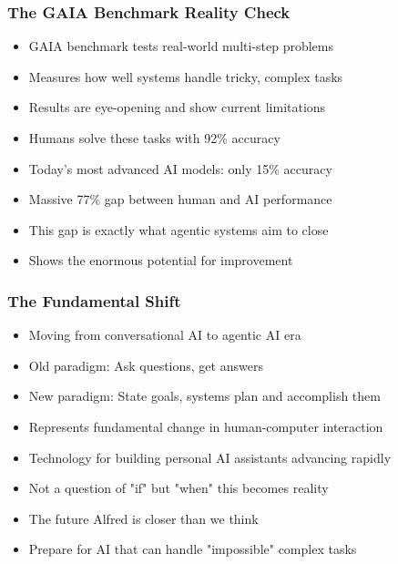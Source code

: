 \begin{frame}[fragile]\frametitle{The GAIA Benchmark Reality Check}
      \begin{itemize}
        \item GAIA benchmark tests real-world multi-step problems
        \item Measures how well systems handle tricky, complex tasks
        \item Results are eye-opening and show current limitations
        \item Humans solve these tasks with 92\% accuracy
        \item Today's most advanced AI models: only 15\% accuracy
        \item Massive 77\% gap between human and AI performance
        \item This gap is exactly what agentic systems aim to close
        \item Shows the enormous potential for improvement
      \end{itemize}
\end{frame}

\begin{frame}[fragile]\frametitle{The Fundamental Shift}
      \begin{itemize}
        \item Moving from conversational AI to agentic AI era
        \item Old paradigm: Ask questions, get answers
        \item New paradigm: State goals, systems plan and accomplish them
        \item Represents fundamental change in human-computer interaction
        \item Technology for building personal AI assistants advancing rapidly
        \item Not a question of "if" but "when" this becomes reality
        \item The future Alfred is closer than we think
        \item Prepare for AI that can handle "impossible" complex tasks
      \end{itemize}
\end{frame}


